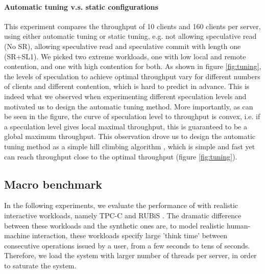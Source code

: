 \paragraph{Automatic tuning v.s. static configurations} This experiment compares the throughput of 10 clients and 160 clients per server, using either automatic tuning or static tuning, e.g. not allowing speculative read (No SR), allowing speculative read and speculative commit with length one (SR+SL1). We picked two extreme workloads, one with low local and remote contention, and one with high contention for both. As shown in figure \ref{fig:tuning}, the levels of speculation to achieve optimal throughput vary for different numbers of clients and different contention, which is hard to predict in advance. This is indeed what we observed when experimenting different speculation levels and motivated us to design the automatic tuning method. More importantly, as can be seen in the figure, the curve of speculation level to throughput is convex, i.e. if a speculation level gives local maximal throughput, this is guaranteed to be a global maximum throughput. This observation drove us to design the automatic tuning method as a simple hill climbing algorithm \cite{hillclimbing}, which is simple and fast yet can reach throughput close to the optimal throughput (figure \ref{fig:tuning}).



\subsection{Macro benchmark}
In the following experiments, we evaluate the performance of \specula with realistic interactive workloads, namely TPC-C\cite{tpcc} and RUBiS \cite{rubis}. The dramatic difference between these workloads and the synthetic ones are, to model realistic human-machine interaction, these workloads specify large 'think time' between consecutive operations issued by a user, from a few seconds to tens of seconds. Therefore, we load the system with larger number of threads per server, in order to saturate the system.

